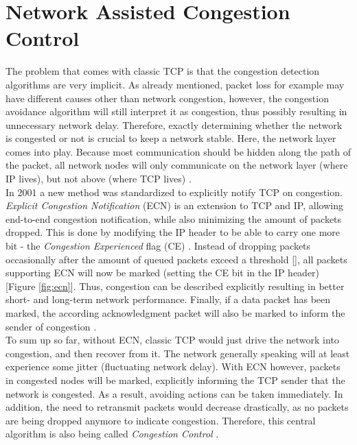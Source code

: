 \documentclass[a4paper,conference]{IEEEtran}
\begin{document}
\section{Network Assisted Congestion Control}
The problem that comes with classic TCP is that the congestion detection algorithms are very implicit. As already mentioned, packet loss for example may have different causes other than network congestion, however, the congestion avoidance algorithm will still interpret it as congestion, thus possibly resulting in unnecessary network delay. Therefore, exactly determining whether the network is congested or not is crucial to keep a network stable. Here, the network layer comes into play. Because most communication should be hidden along the path of the packet, all network nodes will only communicate on the network layer (where IP lives), but not above (where TCP lives) \cite{ramakrishnan1999proposal}.\\
In 2001 a new method was standardized to explicitly notify TCP on congestion. \textit{Explicit Congestion Notification} (ECN) is an extension to TCP and IP, allowing end-to-end congestion notification, while also minimizing the amount of packets dropped. This is done by modifying the IP header to be able to carry one more bit - the \textit{Congestion Experienced} flag (CE) \cite{ramakrishnan1999proposal}. Instead of dropping packets occasionally after the amount of queued packets exceed a threshold [], all packets supporting ECN will now be marked (setting the CE bit in the IP header) [Figure \ref{fig:ecn}]. Thus, congestion can be described explicitly resulting in better short- and long-term network performance. Finally, if a data packet has been marked, the according acknowledgment packet will also be marked to inform the sender of congestion \cite{ramakrishnan1999proposal,ramakrishnan2001addition,10.1145/205511.205512}.\\
To sum up so far, without ECN, classic TCP would just drive the network into congestion, and then recover from it. The network generally speaking will at least experience some jitter (fluctuating network delay). With ECN however, packets in congested nodes will be marked, explicitly informing the TCP sender that the network is congested. As a result, avoiding actions can be taken immediately. In addition, the need to retransmit packets would decrease drastically, as no packets are being dropped anymore to indicate congestion. Therefore, this central algorithm is also being called \textit{Congestion Control} \cite{ramakrishnan1999proposal,ramakrishnan2001addition}.
\end{document}

